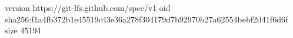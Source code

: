 version https://git-lfs.github.com/spec/v1
oid sha256:f1a4fb372b1e45519c43e36a278f304179d7b92970b27a62554bebf2d41f6d6f
size 45194
